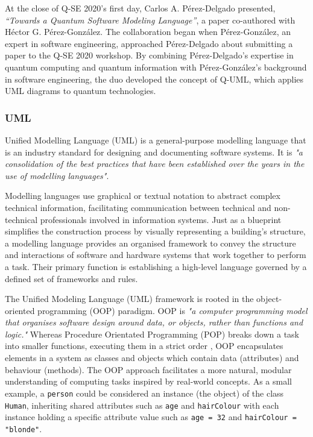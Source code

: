 \documentclass{article}
\begin{document}
{At the close of Q-SE 2020's first day, Carlos A. Pérez-Delgado presented, \textit{“Towards a Quantum Software Modeling Language”}\cite{Perez-Delgado2020}, a paper co-authored with Héctor G. Pérez-González. The collaboration began when Pérez-González, an expert in software engineering, approached Pérez-Delgado about submitting a paper to the Q-SE 2020 workshop. By combining Pérez-Delgado's expertise in quantum computing and quantum information with Pérez-González's background in software engineering, the duo developed the concept of Q-UML, which applies UML diagrams to quantum technologies\cite{Towards}.

\subsubsection{UML}

Unified Modelling Language (UML) is a general-purpose modelling language that is an industry standard for designing and documenting software systems. It is \textit{"a consolidation of the best practices that have been established over the years in the use of modelling languages"}\cite{Seidl_Scholz_Huemer_Kappel_Duffy_2014}.

Modelling languages use graphical or textual notation to abstract complex technical information, facilitating communication between technical and non-technical professionals involved in information systems. Just as a blueprint simplifies the construction process by visually representing a building’s structure, a modelling language provides an organised framework to convey the structure and interactions of software and hardware systems that work together to perform a task\cite{Seidl_Scholz_Huemer_Kappel_Duffy_2014}. Their primary function is establishing a high-level language governed by a defined set of frameworks and rules\cite{Modelinglanguagemean}.

The Unified Modeling Language (UML) framework is rooted in the object-oriented programming (OOP) paradigm. OOP is \textit{"a computer programming model that organises software design around data, or objects, rather than functions and logic."}\cite{TechTargetOOP} Whereas Procedure Orientated Programming (POP) breaks down a task into smaller functions, executing them in a strict order \cite{OOPPOP}, OOP encapsulates elements in a system as classes and objects which contain data (attributes) and behaviour (methods)\cite{MediumOOPPOP}. The OOP approach facilitates a more natural, modular understanding of computing tasks inspired by real-world concepts\cite{Seidl_Scholz_Huemer_Kappel_Duffy_2014}. As a small example, a \texttt{person} could be considered an instance (the object) of the class \texttt{Human}, inheriting shared attributes such as \texttt{age} and \texttt{hairColour} with each instance holding a specific attribute value such as \texttt{age = 32} and \texttt{hairColour = "blonde"}.

}
\end{document}
